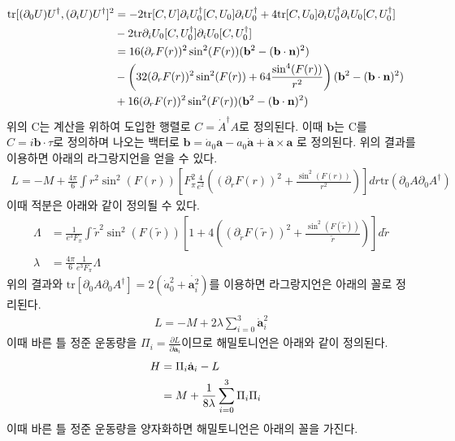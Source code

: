 \documentclass[superscriptaddress,
nofootinbib,byrevtex,fleqn,prd,12pt]{revtex4}
\newcommand{\tr}{\mathrm{tr}}
\begin{document}
\begin{align}
  \tr[(\partial_{0}U)U^{\dagger},(\partial_{i}U)U^{\dagger}]^{2} &= -2 \tr [C,U]\partial_{i} U_{0}^{\dagger}[C,U_{0}] \partial_{i}U_{0}^{\dagger} + 4\tr [C,U_{0}]\partial_{i}
  U_{0}^{\dagger}\partial_{i}U_{0}[C,U_{0}^{\dagger}] \cr
  &- 2 \tr\partial_{i} U_{0} [C,U_{0}^{\dagger}] \partial_{i} U_{0} [C,U_{0}^{\dagger}] \cr
  &= 16(\partial_{r}F(r))^{2}\sin^{2}(F(r))(\mathbf{b}^{2}-(\mathbf{b} \cdot \mathbf{n})^{2}) \cr
  &- \left(32 (\partial_{r}F(r))^{2} \sin^{2}(F(r)) + 64\frac{\sin^{4}(F(r))}{r^{2}} \right)(\mathbf{b}^{2} - (\mathbf{b} \cdot \mathbf{n})^{2}) \cr
  &+ 16(\partial_{r}F(r))^{2}\sin^{2}(F(r))(\mathbf{b}^{2}-(\mathbf{b} \cdot \mathbf{n})^{2})
\end{align}
위의 C는 계산을 위하여 도입한 행렬로 $ C= \dot{A}^{\dagger}A $로 정의된다. 이때 $ \mathbf{b} $는 C를 $ C= i \mathbf{b} \cdot \tau $로 정의하며 나오는 백터로 $\mathbf{b}=\dot{a}_{0} \mathbf{a} - a_{0}\dot{\mathbf{a}} + \dot{\mathbf{a}}  \times \mathbf{a}$ 로 정의된다.
위의 결과를 이용하면 아래의 라그랑지언을 얻을 수 있다.
\begin{align}
  L = -M + \frac{4\pi}{6} \int r^{2} \sin^{2}(F(r))\left[ F_{\pi}^{2} \frac{4}{e^{2}}\left((\partial_{r}F(r))^{2} + \frac{\sin^{2}(F(r))}{r^{2}} \right) \right] dr \tr (\partial_{0} A
   \partial_{0} A ^{\dagger})
\end{align}
 이때 적분은 아래와 같이 정의될 수 있다.
 \begin{align}
   \Lambda &= \frac{1}{e^{3}F_{\pi}} \int \tilde{r}^{2} \sin^{2}(F(\tilde{r}))\left[1 + 4 \left((\partial_{\tilde{r}}F(\tilde{r}))^{2}+\frac{\sin^{2}(F(\tilde{r}))}{\tilde{r}} \right) \right] d\tilde{r}\\
   \lambda &=\frac{4\pi}{6}\frac{1}{e^{3}F_{\pi}}\Lambda
 \end{align}
 위의 결과와 $ \tr[\partial_{0}A \partial_{0}A^{\dagger}] =2(\dot{a}_{0}^{2} +\dot{\mathbf{a}_{i}^{2}}) $를 이용하면 라그랑지언은 아래의 꼴로 정리된다.
 \begin{align}
   L= -M +2 \lambda \sum_{i=0}^{3} \dot{\mathbf{a}}_{i}^{2}
 \end{align}
 이때 바른 틀 정준 운동량을 $\Pi_{i} = \frac{\partial L}{\partial \dot{\mathbf{a}}_{i}} $이므로 해밀토니언은 아래와 같이 정의된다.\cite{1}
 \begin{align}
  H &= \Pi_{i}\dot{\mathbf{a}}_{i} - L \cr
  &= M + \frac{1}{8\lambda} \sum_{i=0}^{3} \Pi_{i} \Pi_{i}
 \end{align}
 이때 바른 틀 정준 운동량을 양자화하면 해밀토니언은 아래의 꼴을 가진다.
\end{document}
